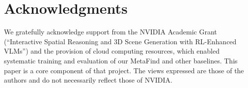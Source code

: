 \documentclass{article}
\begin{document}
\clearpage

\section{Acknowledgments}
We gratefully acknowledge support from the NVIDIA Academic Grant (“Interactive Spatial Reasoning and 3D Scene Generation with RL-Enhanced VLMs”) and the provision of cloud computing resources, which enabled systematic training and evaluation of our MetaFind and other baselines. This paper is a core component of that project. The views expressed are those of the authors and do not necessarily reflect those of NVIDIA.



\clearpage

\end{document}
